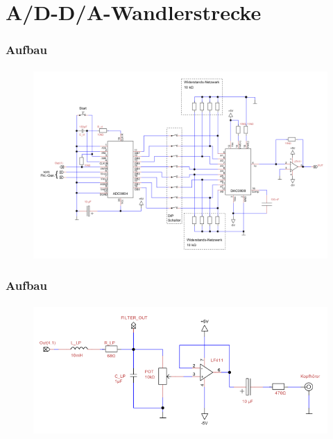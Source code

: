 \section{A/D-D/A-Wandlerstrecke} %
\label{sec:A/D-D/A-Wandlerstrecke}
\begin{frame}
    \frametitle{Aufbau}
    \framesubtitle{}
    \begin{figure}[H]
    \begin{center}
            \includegraphics[scale=0.5]{./img/schaltung/wandlerstrecke.png}
    \end{center}
    \end{figure}
\end{frame}
\begin{frame}
    \frametitle{Aufbau}
    \framesubtitle{}
    \begin{figure}[H]
    \begin{center}
            \includegraphics[scale=0.5]{./img/schaltung/verstaerker.png}
    \end{center}
    \end{figure}
\end{frame}



